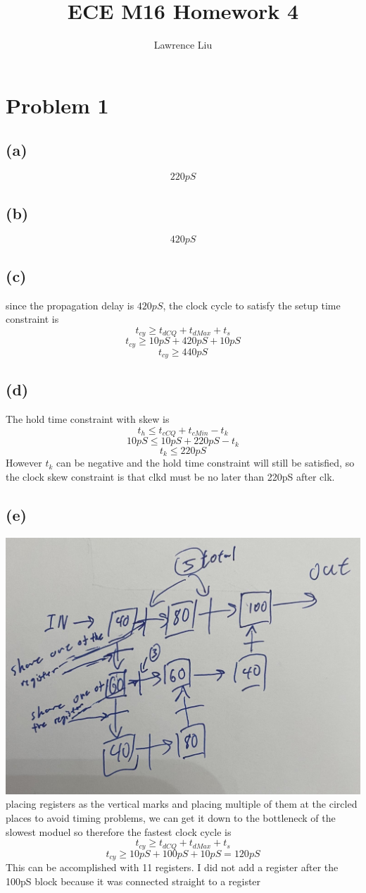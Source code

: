 \documentclass[12pt]{article}
\title{ECE M16 Homework 4}
\author{Lawrence Liu}
\begin{document}
\maketitle
\section*{Problem 1}
\subsection*{(a)}
$$\boxed{220pS}$$
\subsection*{(b)}
$$\boxed{420pS}$$
\subsection*{(c)}
since the propagation delay is $420pS$, the clock cycle to satisfy the
setup time constraint is 
$$t_{cy}\geq t_{dCQ}+t_{dMax}+t_s$$
$$t_{cy}\geq 10pS+420pS+10pS$$
$$t_{cy}\geq \boxed{440pS}$$ 
\subsection*{(d)}
The hold time constraint with skew is 
$$t_h\leq t_{cCQ}+t_{cMin}-t_{k}$$
$$10pS \leq 10pS+220pS-t_k$$
$$t_k\leq220pS$$
However $t_k$ can be negative and the hold time constraint will still be satisfied, so the clock skew constraint is 
that clkd must be no later than 220pS after clk.
\subsection*{(e)}
\includegraphics[scale=0.2]{Fig2.jpg}\\
placing registers as the vertical marks and placing multiple of them at the circled places to avoid timing problems, we can get it down to the bottleneck of the slowest moduel
so therefore the fastest clock cycle is 
$$t_{cy}\geq t_{dCQ}+t_{dMax}+t_s$$
$$t_{cy}\geq 10pS+100pS+10pS=\boxed{120pS}$$
This can be accomplished with 11 registers. I did not add a register after the 100pS block because it was connected straight to a register
\end{document}
